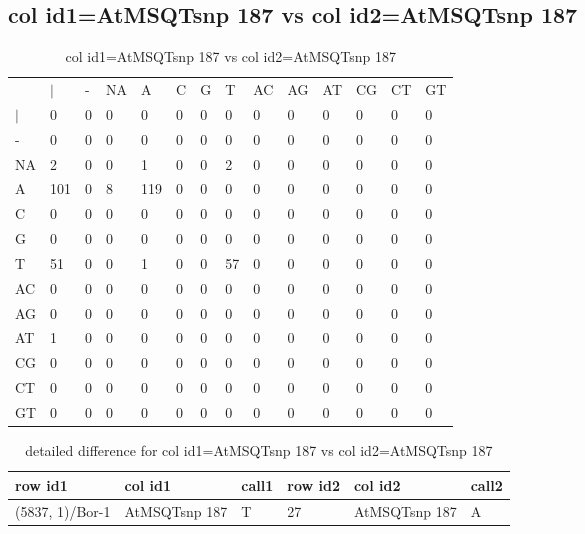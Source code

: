 \subsection{col id1=AtMSQTsnp 187 vs col id2=AtMSQTsnp 187}
\begin{center}
\begin{longtable}{|l|l|l|l|l|l|l|l|l|l|l|l|l|l|}
\caption{col id1=AtMSQTsnp 187 vs col id2=AtMSQTsnp 187} \label{table_dm758}\\
\hline
\\
\hline
&$|$&-&NA&A&C&G&T&AC&AG&AT&CG&CT&GT\\
$|$&0&0&0&0&0&0&0&0&0&0&0&0&0\\
-&0&0&0&0&0&0&0&0&0&0&0&0&0\\
NA&2&0&0&1&0&0&2&0&0&0&0&0&0\\
A&101&0&8&119&0&0&0&0&0&0&0&0&0\\
C&0&0&0&0&0&0&0&0&0&0&0&0&0\\
G&0&0&0&0&0&0&0&0&0&0&0&0&0\\
T&51&0&0&1&0&0&57&0&0&0&0&0&0\\
AC&0&0&0&0&0&0&0&0&0&0&0&0&0\\
AG&0&0&0&0&0&0&0&0&0&0&0&0&0\\
AT&1&0&0&0&0&0&0&0&0&0&0&0&0\\
CG&0&0&0&0&0&0&0&0&0&0&0&0&0\\
CT&0&0&0&0&0&0&0&0&0&0&0&0&0\\
GT&0&0&0&0&0&0&0&0&0&0&0&0&0\\
\hline
\end{longtable}
\end{center}

\begin{center}
\begin{longtable}{|l|l|l|l|l|l|}
\caption{detailed difference for col id1=AtMSQTsnp 187 vs col id2=AtMSQTsnp 187} \label{table_dm759}\\
\hline
row id1&col id1&call1&row id2&col id2&call2\\
\hline
(5837, 1)/Bor-1&AtMSQTsnp 187&T&27&AtMSQTsnp 187&A\\
\hline
\end{longtable}
\end{center}

